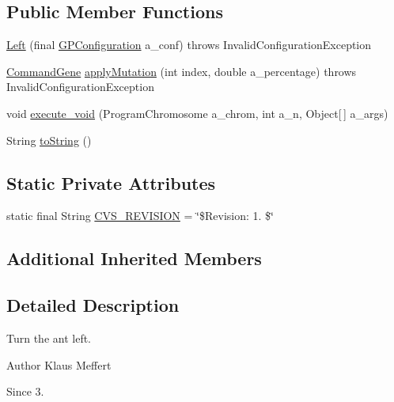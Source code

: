 \subsection*{Public Member Functions}
\begin{DoxyCompactItemize}
\item 
\hyperlink{classexamples_1_1gp_1_1anttrail_1_1_left_ab308dbaabe54e078d3411be30628af24}{Left} (final \hyperlink{classorg_1_1jgap_1_1gp_1_1impl_1_1_g_p_configuration}{G\-P\-Configuration} a\-\_\-conf)  throws Invalid\-Configuration\-Exception 
\item 
\hyperlink{classorg_1_1jgap_1_1gp_1_1_command_gene}{Command\-Gene} \hyperlink{classexamples_1_1gp_1_1anttrail_1_1_left_ae9d7ce9b94c05fdd9d0f860b0950acaf}{apply\-Mutation} (int index, double a\-\_\-percentage)  throws Invalid\-Configuration\-Exception 
\item 
void \hyperlink{classexamples_1_1gp_1_1anttrail_1_1_left_a6b0b043d5bf9a03cc0fc151e0969a532}{execute\-\_\-void} (Program\-Chromosome a\-\_\-chrom, int a\-\_\-n, Object\mbox{[}$\,$\mbox{]} a\-\_\-args)
\item 
String \hyperlink{classexamples_1_1gp_1_1anttrail_1_1_left_a4034b0fbbc6e37428177a94bb4951c72}{to\-String} ()
\end{DoxyCompactItemize}
\subsection*{Static Private Attributes}
\begin{DoxyCompactItemize}
\item 
static final String \hyperlink{classexamples_1_1gp_1_1anttrail_1_1_left_a919561346e1d7dff16bb3d0b68e06083}{C\-V\-S\-\_\-\-R\-E\-V\-I\-S\-I\-O\-N} = \char`\"{}\$Revision\-: 1. \$\char`\"{}
\end{DoxyCompactItemize}
\subsection*{Additional Inherited Members}


\subsection{Detailed Description}
Turn the ant left.

\begin{DoxyAuthor}{Author}
Klaus Meffert 
\end{DoxyAuthor}
\begin{DoxySince}{Since}
3. 
\end{DoxySince}


